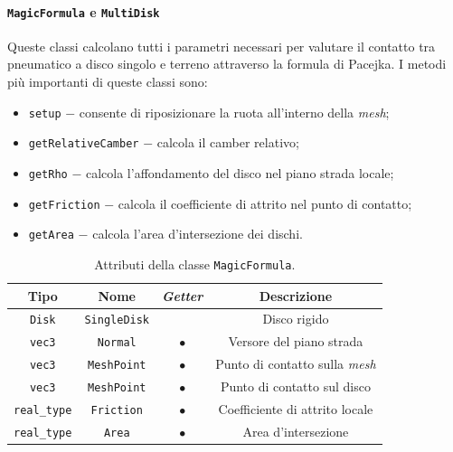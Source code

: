 \paragraph{\texttt{MagicFormula} e \texttt{MultiDisk}}
Queste classi calcolano tutti i parametri necessari per valutare il contatto tra pneumatico a disco singolo e terreno attraverso la formula di Pacejka. I metodi più importanti di queste classi sono:
\begin{itemize}
	\item \texttt{setup} $-$ consente di riposizionare la ruota all'interno della \textit{mesh};
	\item \texttt{getRelativeCamber} $-$ calcola il camber relativo;
	\item \texttt{getRho} $-$ calcola l'affondamento del disco nel piano strada locale;
	\item \texttt{getFriction} $-$ calcola il coefficiente di attrito nel punto di contatto;
	\item \texttt{getArea} $-$ calcola l'area d'intersezione dei dischi.
\end{itemize}
%
\begin{table}[h!]
	\centering
	\begin{tabular}{|c|c|c|c|}
		\hline 
		\textbf{Tipo} & \textbf{Nome} & \textit{\textbf{Getter}} & \textbf{Descrizione} \\ \hline 
		\texttt{Disk} & \texttt{SingleDisk} &  & Disco rigido \\ \hline 
		\texttt{vec3} & \texttt{Normal} & $\bullet$ & Versore del piano strada \\ \hline
		\texttt{vec3} & \texttt{MeshPoint} & $\bullet$ & Punto di contatto sulla \textit{mesh} \\ \hline
		\texttt{vec3} & \texttt{MeshPoint} & $\bullet$ & Punto di contatto sul disco \\ \hline
		\texttt{real\_type} & \texttt{Friction} & $\bullet$ & Coefficiente di attrito locale \\ \hline
		\texttt{real\_type} & \texttt{Area} & $\bullet$ & Area d'intersezione \\ \hline
	\end{tabular}
	\caption{Attributi della classe \texttt{MagicFormula}.}
	\label{}
\end{table}
%
